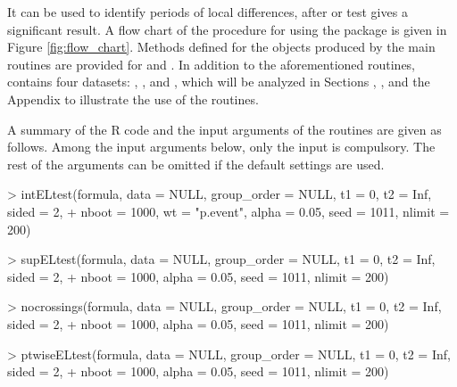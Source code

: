 It can be used to identify periods of local differences, after  or  test gives a significant result. A flow chart of the procedure for using the  package is given in Figure \ref{fig:flow_chart}.
Methods defined for the objects produced by the main routines are provided for  and .
In addition to the aforementioned routines,  contains four datasets: , ,  and  , which will be analyzed in Sections , , and the Appendix to illustrate the use of the routines. 


A summary of the R code and the input arguments of the routines are given as follows. Among the input arguments below, only the  input is compulsory. The rest of the arguments can be omitted if the default settings are used. \\
\begin{example}
>   intELtest(formula, data = NULL, group_order = NULL, t1 = 0, t2 = Inf, sided = 2,
+   nboot = 1000, wt = "p.event", alpha = 0.05, seed = 1011, nlimit = 200)
\end{example}
\begin{example}
>   supELtest(formula, data = NULL, group_order = NULL, t1 = 0, t2 = Inf, sided = 2,
+   nboot = 1000, alpha = 0.05, seed = 1011, nlimit = 200)
\end{example}
\begin{example}
>   nocrossings(formula, data = NULL, group_order = NULL, t1 = 0, t2 = Inf, sided = 2,
+   nboot = 1000, alpha = 0.05, seed = 1011, nlimit = 200)
\end{example}
\begin{example}
>   ptwiseELtest(formula, data = NULL, group_order = NULL, t1 = 0, t2 = Inf, sided = 2,
+   nboot = 1000, alpha = 0.05, seed = 1011, nlimit = 200)
\end{example}

